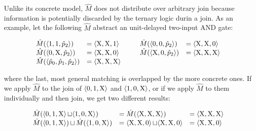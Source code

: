 


Unlike its concrete model, $\hat M$ does not distribute over arbitrary join because information is potentially discarded by the ternary logic durin a join. As an example, let the following $\hat M$ abstract an unit-delayed two-input AND gate:


\begin{equation*}
\begin{array}{llll}
  \hat M(\langle 1, 1, \hat p_{2} \rangle) & = \langle \mathrm{X}, \mathrm{X}, 1 \rangle \qquad & \hat M(\langle 0, 0, \hat p_{2} \rangle) & = \langle \mathrm{X}, \mathrm{X}, 0 \rangle \\
  \hat M(\langle 0, \mathrm{X}, \hat p_{2} \rangle) & = \langle \mathrm{X}, \mathrm{X}, 0 \rangle & \hat M(\langle \mathrm{X}, 0, \hat p_{2} \rangle) & = \langle \mathrm{X}, \mathrm{X}, \mathrm{X} \rangle \\
  \hat M(\langle \hat p_{0}, \hat p_{1}, \hat p_{2} \rangle) & = \langle \mathrm{X}, \mathrm{X}, \mathrm{X} \rangle & &
\end{array}
\end{equation*}


\noindent where the last, most general matching is overlapped by the more concrete ones. If we apply $\hat M$ to the join of $\langle 0, 1, \mathrm{X} \rangle$ and $\langle 1, 0, \mathrm{X} \rangle$, or if we apply $\hat M$ to them individually and then join, we get two different results:

\begin{equation*}
\begin{array}{lll}
  \hat M(\langle 0, 1, \mathrm{X} \rangle \operatorname{\sqcup} \langle 1, 0, \mathrm{X} \rangle) &= \hat M(\langle \mathrm{X}, \mathrm{X}, \mathrm{X} \rangle) &= \langle \mathrm{X}, \mathrm{X}, \mathrm{X} \rangle \\
  \hat M(\langle 0, 1, \mathrm{X} \rangle) \operatorname{\sqcup} \hat M(\langle 1, 0, \mathrm{X} \rangle) &= \langle \mathrm{X}, \mathrm{X}, 0 \rangle \operatorname{\sqcup} \langle \mathrm{X}, \mathrm{X}, 0 \rangle &= \langle \mathrm{X}, \mathrm{X}, 0 \rangle
\end{array}
\end{equation*}

